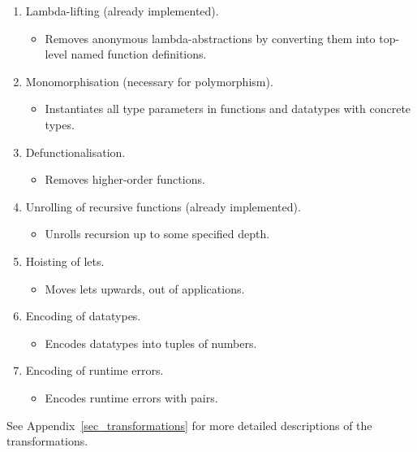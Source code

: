 \begin{enumerate}
\item Lambda-lifting (already implemented).
  {\small
  \begin{itemize}
  \item Removes anonymous lambda-abstractions by converting them into
    top-level named function definitions.
  \end{itemize} }
\item Monomorphisation (necessary for polymorphism).
  {\small
    \begin{itemize}
    \item Instantiates all type parameters in functions and datatypes with concrete types.
  \end{itemize} }
\item Defunctionalisation.
  {\small
    \begin{itemize}
    \item Removes higher-order functions.
  \end{itemize} }
\item Unrolling of recursive functions (already implemented).
  {\small
    \begin{itemize}
    \item Unrolls recursion up to some specified depth.
  \end{itemize} }
\item Hoisting of lets.
  {\small
    \begin{itemize}
    \item Moves lets upwards, out of applications.
  \end{itemize} }
\item Encoding of datatypes.
  {\small
    \begin{itemize}
    \item Encodes datatypes into tuples of numbers.
  \end{itemize} }
\item Encoding of runtime errors.
  {\small
    \begin{itemize}
    \item Encodes runtime errors with pairs.
  \end{itemize} }
\end{enumerate}
See Appendix~\ref{sec_transformations} for more detailed descriptions
of the transformations.

